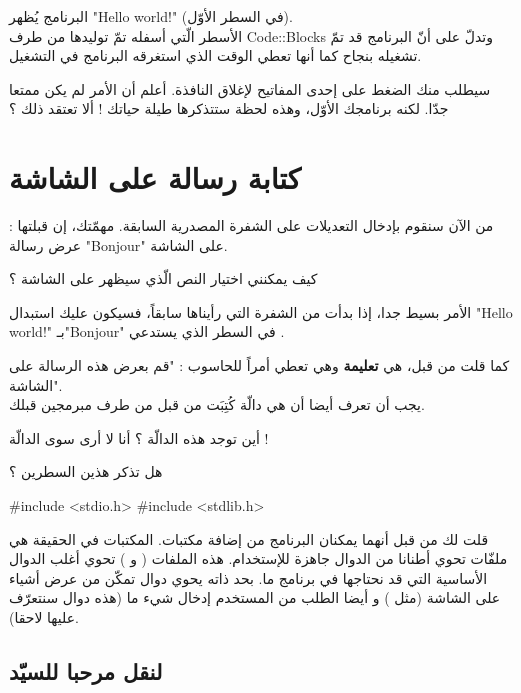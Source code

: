 البرنامج يُظهر
"\textenglish{Hello world!}"
 (في السطر الأوّل).\\
الأسطر الّتي أسفله تمّ توليدها من طرف
\textenglish{Code::Blocks}
 وتدلّ على أنّ البرنامج قد تمّ تشغيله بنجاح كما أنها تعطي الوقت الذي استغرقه البرنامج في التشغيل.

 سيطلب منك الضغط على إحدى المفاتيح لإغلاق النافذة. أعلم أن الأمر لم يكن ممتعا جدّا. لكنه برنامجك الأوّل، وهذه لحظة ستتذكرها طيلة حياتك ! ألا تعتقد ذلك ؟

\section{كتابة رسالة على الشاشة}

من الآن سنقوم بإدخال التعديلات على الشفرة المصدرية السابقة. مهمّتك، إن قبلتها : عرض رسالة
"\textenglish{Bonjour}"
 على الشاشة.

\begin{question}
  كيف يمكنني اختيار النص الّذي سيظهر على الشاشة ؟
\end{question}

الأمر بسيط جدا، إذا بدأت من الشفرة التي رأيناها سابقاً، فسيكون عليك استبدال
"\textenglish{Hello world!}"
 بـ"\textenglish{Bonjour}"
 في السطر الذي يستدعي
.

كما قلت من قبل،
 هي
\textbf{تعليمة}
 وهي تعطي أمراً للحاسوب : "قم بعرض هذه الرسالة على الشاشة".\\
يجب أن تعرف أيضا أن
 هي دالّة كُتِبَت من قبل من طرف مبرمجين قبلك.

\begin{question}
   أين توجد هذه الدالّة ؟ أنا لا أرى سوى الدالّة  !
\end{question}

هل تذكر هذين السطرين ؟

\begin{Csource}
#include <stdio.h>
#include <stdlib.h>
\end{Csource}

قلت لك من قبل أنهما يمكنان البرنامج من إضافة مكتبات. المكتبات في الحقيقة هي ملفّات تحوي أطنانا من الدوال جاهزة للإستخدام. هذه الملفات
( و )
 تحوي أغلب الدوال الأساسية التي قد نحتاجها في برنامج ما.
 بحد ذاته يحوي دوال تمكّن من عرض أشياء على الشاشة (مثل
 )
 و أيضا الطلب من المستخدم إدخال شيء ما (هذه دوال سنتعرّف عليها لاحقا).

\subsection{لنقل مرحبا للسيّد}

